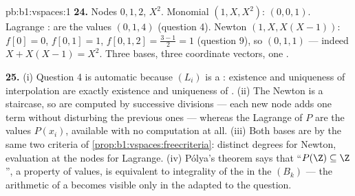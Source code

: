 \begin{solution}{pb:b1:vspaces:1}
\textbf{24.} Nodes $0, 1, 2$,  $X^2$. Monomial 
$(1, X, X^2)$:  $(0, 0, 1)$. Lagrange :
 are the values $(0, 1, 4)$ (question 4). Newton 
$(1, X, X(X-1))$:  $f[0] = 0$, $f[0,1] = 1$,
$f[0,1,2] = \frac{3 - 1}{2} = 1$ (question 9), so 
$(0, 1, 1)$ --- indeed $X + X(X-1) = X^2$. Three bases, three
coordinate vectors, one .

\textbf{25.} (i) Question 4 is automatic because $(L_i)$ is a
\emph{}: existence and uniqueness of interpolation are
exactly existence and uniqueness of . (ii) The Newton
 is a staircase, so  are computed by successive
divisions --- each new node adds one term without disturbing the
previous ones --- whereas the Lagrange  of $P$ are the
values $P(x_i)$, available with no computation at all. (iii) Both
bases are  by the same two criteria of
\cref{prop:b1:vspaces:freecriteria}: distinct degrees for Newton,
evaluation at the nodes for Lagrange. (iv) P\'olya's theorem says
that ``$P(\Z) \subseteq \Z$'', a property of values, is equivalent
to integrality of the  in the  $(B_k)$ --- the
arithmetic of a  becomes visible only in the 
adapted to the question.
\end{solution}
